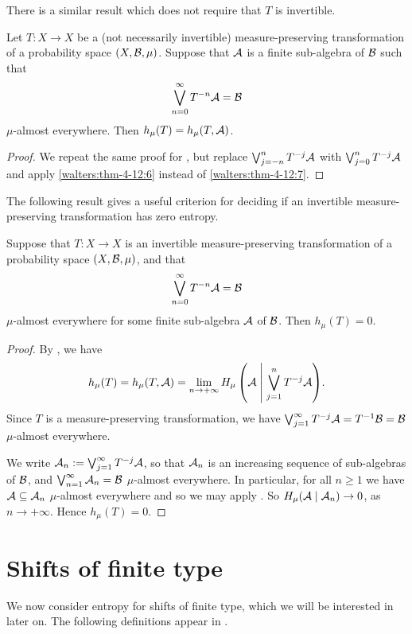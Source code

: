 There is a similar result which does not require that $T$ is invertible.

\begin{theorem} \label{thm:walters-4-18}
	Let $T : X \to X$ be a (not necessarily invertible) measure-preserving transformation of a probability space $(X, \mathcal{B}, \mu)$. Suppose that $\mathcal{A}$ is a finite sub-algebra of $\mathcal{B}$ such that
	\[
		\bigvee_{n = 0}^\infty{T^{-n}{\mathcal{A}}} = \mathcal{B}
	\]
	$\mu$-almost everywhere. Then $h_\mu(T) = h_\mu(T, \mathcal{A})$.
	
	\begin{proof}
		We repeat the same proof for , but replace $\bigvee_{j = -n}^n{T^{-j}{\mathcal{A}}}$ with $\bigvee_{j = 0}^n{T^{-j}{\mathcal{A}}}$ and apply  \ref{walters:thm-4-12:6} instead of \ref{walters:thm-4-12:7}.
	\end{proof}
\end{theorem}

The following result gives a useful criterion for deciding if an invertible measure-preserving transformation has zero entropy.

\begin{corollary}
	Suppose that $T : X \to X$ is an invertible measure-preserving transformation of a probability space $(X, \mathcal{B}, \mu)$, and that
	\[
		\bigvee_{n = 0}^\infty{T^{-n}{\mathcal{A}}} = \mathcal{B}
	\]
	$\mu$-almost everywhere for some finite sub-algebra $\mathcal{A}$ of $\mathcal{B}$. Then $h_\mu(T) = 0$.
	
	\begin{proof}
		By , we have
		\[
			h_\mu(T) = h_\mu(T, \mathcal{A}) = \lim_{n \to +\infty}{H_\mu\left(\mathcal{A} \mathrel{}\middle|\mathrel{} \bigvee_{j = 1}^n{T^{-j}{\mathcal{A}}}\right)}.
		\]
		Since $T$ is a measure-preserving transformation, we have $\bigvee_{j = 1}^\infty{T^{-j}{\mathcal{A}}} = T^{-1}{\mathcal{B}} = \mathcal{B}$ $\mu$-almost everywhere.
		
		We write $\mathcal{A}_n := \bigvee_{j = 1}^\infty{T^{-j}{\mathcal{A}}}$, so that $\mathcal{A}_n$ is an increasing sequence of sub-algebras of $\mathcal{B}$, and $\bigvee_{n = 1}^\infty{\mathcal{A}_n} = \mathcal{B}$ $\mu$-almost everywhere. In particular, for all $n \geq 1$ we have $\mathcal{A} \subseteq \mathcal{A}_n$ $\mu$-almost everywhere and so we may apply . So $H_\mu(\mathcal{A} \mid \mathcal{A}_n) \to 0$, as $n \to +\infty$. Hence $h_\mu(T) = 0$.
	\end{proof}
\end{corollary}

\section{Shifts of finite type} \label{sec:entropy:sft}
We now consider entropy for shifts of finite type, which we will be interested in later on. The following definitions appear in \cite{chazottes-maldonado:cbfee}.

